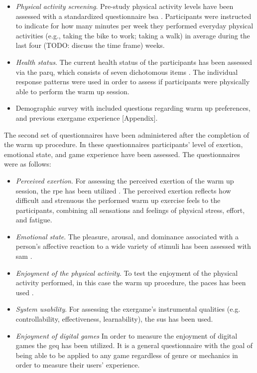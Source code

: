 \begin{itemize}
\item \textit{Physical activity screening}. Pre-study physical activity levels have been assessed with a standardized questionnaire  \gls{bsa} \cite{fuchs2015messung}. Participants were instructed to indicate for how many minutes per week they performed everyday physical activities (e.g., taking the bike to work; taking a walk) in average during the last four (TODO: discuss the time frame) weeks. 
\item \textit{Health status}. The current health status of the participants has been assessed via the \gls{parq}, which consists of seven dichotomous items \cite{thomas1992revision}. The individual response patterns were used in order to assess if participants were physically able to perform the warm up session.
\item Demographic survey with included questions regarding warm up preferences, and previous exergame experience [Appendix].
\end{itemize}
The second set of questionnaires have been administered after the completion of the warm up procedure. In these questionnaires participants' level of exertion, emotional state, and game experience have been assessed. The questionnaires were as follows:
\begin{itemize}
\item \textit{Perceived exertion}. For assessing the perceived exertion of the warm up session, the \gls{rpe} has been utilized \cite{borg1998borg}. The perceived exertion reflects how difficult and strenuous the performed warm up exercise feels to the participants, combining all sensations and feelings of physical stress, effort, and fatigue.
\item \textit{Emotional state}. The pleasure, arousal, and dominance associated with a person's affective reaction to a wide variety of stimuli has been assessed with \gls{sam} \cite{bradley1994measuring}. 
\item \textit{Enjoyment of the physical activity}. To test the enjoyment of the physical activity performed, in this case the warm up procedure, the \gls{paces} has been used \cite{kendzierski1991physical}. 
\item \textit{System usability}. For assessing the exergame's instrumental qualities (e.g. controllability, effectiveness, learnability), the \gls{sus} has been used.
\item \textit{Enjoyment of digital games} In order to measure the enjoyment of digital games the \gls{geq} has been utilized. It is a general questionnaire with the goal of being able to be applied to any game regardless of genre or mechanics in order to measure their users' experience.
\end{itemize}

